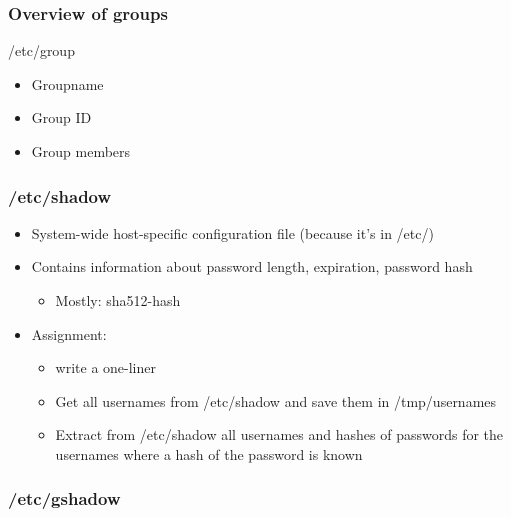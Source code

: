 \documentclass{article}
\begin{document}
\subsubsection{Overview of groups}

/etc/group

\begin{itemize}
    \item Groupname
    \item Group ID
    \item Group members
\end{itemize}

\subsubsection{/etc/shadow}

\begin{itemize}
    \item System-wide host-specific configuration file (because it's in /etc/)
    \item Contains information about password length, expiration, password hash
    \begin{itemize}
        \item Mostly: sha512-hash
    \end{itemize}
    \item Assignment:
    \begin{itemize}
        \item write a one-liner
        \item Get all usernames from /etc/shadow and save them in /tmp/usernames
        \item Extract from /etc/shadow all usernames and hashes of passwords for the usernames where a hash of the password is known
    \end{itemize} 
\end{itemize}

\subsubsection{/etc/gshadow}
\end{document}
